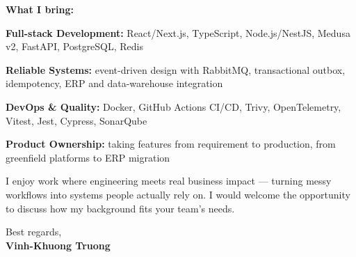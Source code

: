 \documentclass[10pt, letterpaper]{article}
\begin{document}
\begin{onecolentry}
\vspace{0.2cm}

\textbf{What I bring:}

\vspace{0.1cm}

\begin{highlights}
    \item \textbf{Full-stack Development:} React\slash Next.js, TypeScript, Node.js\slash NestJS, Medusa v2, FastAPI, PostgreSQL, Redis
    \item \textbf{Reliable Systems:} event-driven design with RabbitMQ, transactional outbox, idempotency, ERP and data-warehouse integration
    \item \textbf{DevOps \& Quality:} Docker, GitHub Actions CI/CD, Trivy, OpenTelemetry, Vitest, Jest, Cypress, SonarQube
    \item \textbf{Product Ownership:} taking features from requirement to production, from greenfield platforms to ERP migration
\end{highlights}

\vspace{0.2cm}

I enjoy work where engineering meets real business impact --- turning messy workflows into systems people actually rely on. I would welcome the opportunity to discuss how my background fits your team's needs.

\vspace{0.4cm}

Best regards,\\
\textbf{Vinh-Khuong Truong}

\end{onecolentry}
\end{document}
